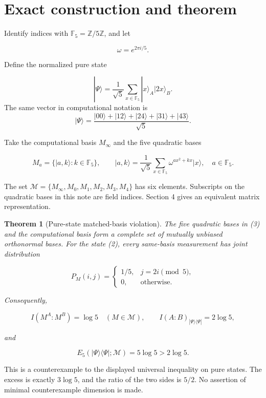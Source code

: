\documentclass[11pt,a4paper]{article}
\newtheorem{theorem}{Theorem}
\begin{document}
\section{Exact construction and theorem}

Identify indices with \(\mathbb F_5=\mathbb Z/5\mathbb Z\), and let

\[
 \omega=e^{2\pi i/5}.
\]

Define the normalized pure state

\[
 |\Psi\rangle=\frac1{\sqrt5}\sum_{x\in\mathbb F_5}|x\rangle_A|2x\rangle_B.
 \tag{2}
\]
The same vector in computational notation is
\[
 |\Psi\rangle=\frac{|00\rangle+|12\rangle+|24\rangle+|31\rangle+|43\rangle}{\sqrt5}.
\]

Take the computational basis \(M_\infty\) and the five quadratic bases

\[
 M_a=\{|a,k\rangle:k\in\mathbb F_5\},\qquad
 |a,k\rangle=\frac1{\sqrt5}\sum_{x\in\mathbb F_5}
 \omega^{a x^2+kx}|x\rangle,
 \quad a\in\mathbb F_5.
 \tag{3}
\]

The set \(\mathcal M=\{M_\infty,M_0,M_1,M_2,M_3,M_4\}\) has six
elements. Subscripts on the quadratic bases in this note are field
indices. Section 4 gives an equivalent matrix representation.

\begin{theorem}[Pure-state matched-basis violation]\label{thm:main}
The five quadratic bases in (3) and the computational basis form a complete
set of mutually unbiased orthonormal bases. For the state (2), every same-basis
measurement has joint distribution

\[
 P_M(i,j)=
 \begin{cases}
  1/5,&j=2i\pmod5,\\
  0,&\text{otherwise}.
 \end{cases}
 \tag{4}
\]

Consequently,

\[
 I(M^A:M^B)=\log5\quad(M\in\mathcal M),\qquad
 I(A:B)_{|\Psi\rangle\langle\Psi|}=2\log5,
 \tag{5}
\]

and

\[
 E_5(|\Psi\rangle\langle\Psi|;\mathcal M)
   =5\log5>2\log5.
 \tag{6}
\]

\end{theorem}

This is a counterexample to the displayed universal inequality
on pure states. The excess is exactly \(3\log5\), and the ratio of the
two sides is \(5/2\). No assertion of minimal counterexample dimension
is made.
\end{document}
